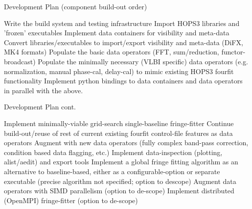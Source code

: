 \documentclass[8pt]{beamer}
\begin{document}
\begin{frame}{Development Plan (component build-out order)}


    \begin{outline}
    \1 Write the build system and testing infrastructure
    \1 Import HOPS3 libraries and 'frozen' executables
    \1 Implement data containers for visibility and meta-data
    \1 Convert libraries/executables to import/export visibility and meta-data (DiFX, MK4 formats)
    \1 Populate the basic data operators (FFT, sum/reduction, functor-broadcast)
    \1 Populate the minimally necessary (VLBI specific) data operators (e.g. normalization, manual phase-cal, delay-cal) to mimic existing HOPS3 fourfit functionality
    \1 Implement python bindings to data containers and data operators in parallel with the above.
    \end{outline}
\end{frame}

\begin{frame}{Development Plan cont.}


\begin{outline}
    \1 Implement minimally-viable grid-search single-baseline fringe-fitter 
    \1 Continue build-out/reuse of rest of current existing fourfit control-file features as data operators
    \1 Augment with new data operators (fully complex band-pass correction, condition based data flagging, etc.)
    \1 Implement data-inspection (plotting, alist/aedit) and export tools
    \1 Implement a global fringe fitting algorithm as an alternative to baseline-based, either as a configurable-option or separate executable (precise algorithm not specified; option to descope)
    \1 Augment data operators with SIMD parallelism (option to de-scope)
    \1 Implement distributed (OpenMPI) fringe-fitter (option to de-scope)
    \end{outline}
\end{frame}
\end{document}
